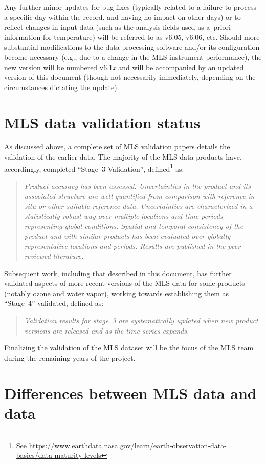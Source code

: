 Any further minor updates for bug fixes (typically related to a failure to process a specific day within the record, and having no impact on other days) or to reflect changes in input data (such as the analysis fields used as a~priori information for temperature) will be referred to as v6.05, v6.06, etc. Should more substantial modifications to the data processing software and/or its configuration become necessary (e.g., due to a change in the MLS instrument performance), the new version will be numbered v6.1\emph{x} and will be accompanied by an updated version of this document (though not necessarily immediately, depending on the circumstances dictating the update).

\section{MLS data validation status}
As discussed above, a complete set of MLS validation papers details the validation of the earlier \vii data. The majority of the \vii MLS data products have, accordingly, completed ``Stage~3 Validation'', defined\footnote{See \url{https://www.earthdata.nasa.gov/learn/earth-observation-data-basics/data-maturity-levels}} as:
%
\begin{quote}
  \itshape Product accuracy has been assessed.  Uncertainties in the product and its associated structure are well quantified from comparison with reference in situ or other suitable reference data. Uncertainties are characterized in a statistically robust way over multiple locations and time periods representing global conditions.  Spatial and temporal consistency of the product and with similar products has been evaluated over globally representative locations and periods.  Results are published in the peer-reviewed literature.
\end{quote}
%
Subsequent work, including that described in this document, has further validated aspects of more recent versions of the MLS data for some products (notably ozone and water vapor), working towards establishing them as ``Stage~4'' validated, defined as:
%
\begin{quote}
  \itshape Validation results for stage~3 are systematically updated when new product versions are released and as the time-series expands.
\end{quote}
%
Finalizing the validation of the \thisv MLS dataset will be the focus of the MLS team during the remaining years of the project.

\section{Differences between MLS \thisv data and \prevv data}
\label{sec:V5vsV4Overview}

